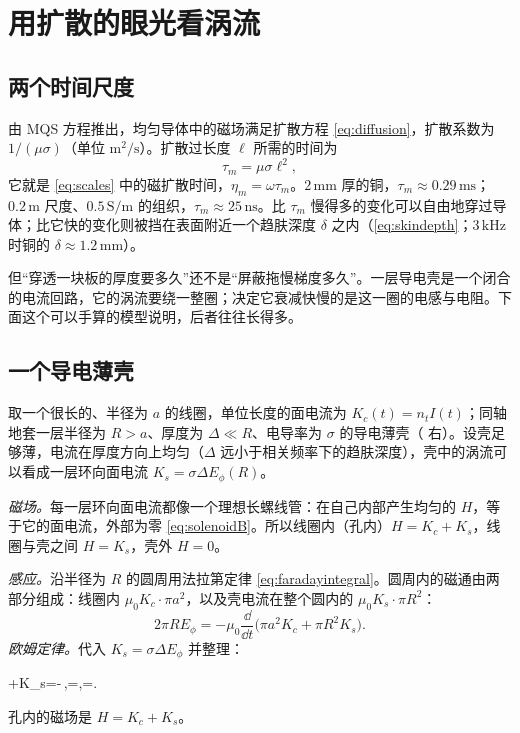 \section{用扩散的眼光看涡流}\label{sec:eddy-diffusion}

\subsection{两个时间尺度}
 由 MQS 方程推出，均匀导体中的磁场满足扩散方程 \eqref{eq:diffusion}，扩散系数为 $1/(\mu\sigma)$（单位 $\mathrm{m^2/s}$）。扩散过长度 $\ell$ 所需的时间为
\begin{equation}
\tau_m=\mu\sigma\ell^2 ,
\end{equation}
它就是 \eqref{eq:scales} 中的磁扩散时间，$\eta_m=\omega\tau_m$。$2\,\mathrm{mm}$ 厚的铜，$\tau_m\approx0.29\,\mathrm{ms}$；$0.2\,\mathrm m$ 尺度、$0.5\,\mathrm{S/m}$ 的组织，$\tau_m\approx25\,\mathrm{ns}$。比 $\tau_m$ 慢得多的变化可以自由地穿过导体；比它快的变化则被挡在表面附近一个趋肤深度 $\delta$ 之内（\eqref{eq:skindepth}；$3\,\mathrm{kHz}$ 时铜的 $\delta\approx1.2\,\mathrm{mm}$）。

但“穿透一块板的厚度要多久”还不是“屏蔽拖慢梯度多久”。一层导电壳是一个闭合的电流回路，它的涡流要绕一整圈；决定它衰减快慢的是这一圈的电感与电阻。下面这个可以手算的模型说明，后者往往长得多。

\subsection{一个导电薄壳}
取一个很长的、半径为 $a$ 的线圈，单位长度的面电流为 $K_c(t)=n_tI(t)$；同轴地套一层半径为 $R>a$、厚度为 $\Delta\ll R$、电导率为 $\sigma$ 的导电薄壳（ 右）。设壳足够薄，电流在厚度方向上均匀（$\Delta$ 远小于相关频率下的趋肤深度），壳中的涡流可以看成一层环向面电流 $K_s=\sigma\Delta E_\phi(R)$。

\emph{磁场。}每一层环向面电流都像一个理想长螺线管：在自己内部产生均匀的 $H$，等于它的面电流，外部为零 \eqref{eq:solenoidB}。所以线圈内（孔内）$H=K_c+K_s$，线圈与壳之间 $H=K_s$，壳外 $H=0$。

\emph{感应。}沿半径为 $R$ 的圆周用法拉第定律 \eqref{eq:faradayintegral}。圆周内的磁通由两部分组成：线圈内 $\mu_0K_c\cdot\pi a^2$，以及壳电流在整个圆内的 $\mu_0K_s\cdot\pi R^2$：
\begin{equation}
2\pi RE_\phi=-\mu_0\frac{\dd}{\dd t}\bigl(\pi a^2K_c+\pi R^2K_s\bigr).
\end{equation}
\emph{欧姆定律。}代入 $K_s=\sigma\Delta E_\phi$ 并整理：
\begin{keyeq*}
\tau{}+K_s=-\kappa\,\tau{},\qquad \tau=,\qquad\kappa=.
\end{keyeq*}
孔内的磁场是 $H=K_c+K_s$。

